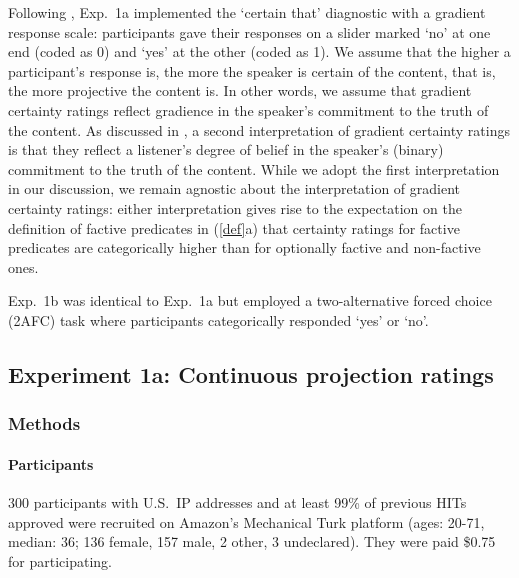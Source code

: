 \documentclass[11pt,fleqn]{article}
\newcommand{\6}{\mbox{$[\hspace*{-.6mm}[$}}
\newcommand{\9}{\mbox{$]\hspace*{-.6mm}]$}}
\begin{document}
Following \citealt{tbd-variability}, Exp.~1a implemented the `certain that' diagnostic with a gradient response scale: participants gave their responses on a slider marked `no' at one end (coded as 0) and `yes' at the other (coded as 1). We assume that the higher a participant's response is, the more the speaker is certain of the content, that is, the more projective the content is. In other words, we assume that gradient certainty ratings reflect gradience in the speaker's commitment to the truth of the content. As discussed in \citealt{tbd-variability}, a second interpretation of gradient certainty ratings is that they reflect a listener's degree of belief in the speaker's (binary) commitment to the truth of the content. While we adopt the first interpretation in our discussion, we remain agnostic about the interpretation of gradient certainty ratings: either interpretation gives rise to the expectation  on the definition of factive predicates in (\ref{def}a) that certainty ratings for factive predicates are categorically higher than for optionally factive and non-factive ones. 

Exp.~1b was identical to Exp.~1a but employed a two-alternative forced choice (2AFC) task where participants categorically responded `yes' or `no'.
 
\subsection{Experiment 1a: Continuous projection ratings}

\subsubsection{Methods}

\paragraph{Participants} 300 participants with U.S.\ IP addresses and at least 99\% of previous HITs approved were recruited on Amazon's Mechanical Turk platform (ages: 20-71, median: 36; 136 female, 157 male, 2 other, 3 undeclared). They were paid \$0.75 for participating.
\end{document}
